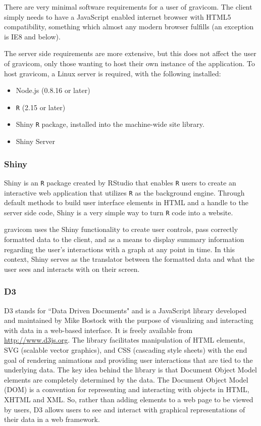 \documentclass{article}\usepackage[]{graphicx}\usepackage[]{color}
\begin{document}
There are very minimal software requirements for a user of gravicom. The client simply needs to have a JavaScript enabled internet browser with HTML5 compatibility, something which almost any modern browser fulfills (an exception is IE8 and below). 

The server side requirements are more extensive, but this does not affect the user of gravicom, only those wanting to host their own instance of the application. To host gravicom, a Linux server is required, with the following installed:

\begin{itemize}
\item Node.js (0.8.16 or later)
\item {\tt R} (2.15 or later)
\item Shiny {\tt R} package, installed into the machine-wide site library. 
\item Shiny Server
\end{itemize}


\subsubsection{Shiny}

Shiny \cite{rs-shiny} is an {\tt R} package created by RStudio that enables {\tt R} users to create an interactive web application that utilizes {\tt R} as the background engine. Through default methods to build user interface elements in HTML and a handle to the server side code, Shiny is a very simple way to turn {\tt R} code into a website. 

gravicom uses the Shiny functionality to create user controls, pass correctly formatted data to the client, and as a means to display summary information regarding the user's interactions with a graph at any point in time. In this context, Shiny serves as the translator between the formatted data and what the user sees and interacts with on their screen.


\subsubsection{D3}

D3 \cite{mb-d3} stands for ``Data Driven Documents" and is a JavaScript library developed and maintained by Mike Bostock with the  purpose of visualizing and interacting with data in a web-based interface. It is freely available from \url{http://www.d3js.org}. The library facilitates manipulation of HTML elements, SVG (scalable vector graphics), and CSS (cascading style sheets) with the end goal of rendering animations and providing user interactions that are tied to the underlying data. The key idea behind the library is that Document Object Model elements are completely determined by the data. The Document Object Model (DOM) is a convention for representing and interacting with objects in HTML, XHTML and XML. So, rather than adding elements to a web page to be viewed by users, D3 allows users to see and interact with graphical representations of their data in a web framework. 
\end{document}
